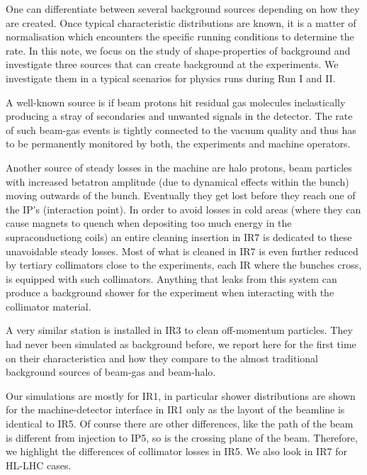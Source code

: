 One can differentiate between several background sources depending on how they are created. Once typical characteristic distributions are known, it is a matter of normalisation which encounters the specific running conditions to determine the rate. In this note, we focus on the study of shape-properties of background and investigate three sources that can create background at the experiments. We investigate them in a typical scenarios for physics runs during Run I and II.

A well-known source is if beam protons hit residual gas molecules inelastically producing a stray of secondaries and unwanted signals in the detector. The rate of such beam-gas events is tightly connected to the vacuum quality and thus has to be permanently monitored by both, the experiments and machine operators.

Another source of steady losses in the machine are halo protons, beam particles with increased betatron amplitude (due to dynamical effects within the bunch) moving outwards of the bunch. Eventually they get lost before they reach one of the IP's (interaction point). In order to avoid losses in cold areas (where they can cause magnets to quench when depositing too much energy in the supraconductiong coils) an entire cleaning insertion in IR7 is dedicated to these unavoidable steady losses. Most of what is cleaned in IR7 is even further reduced by tertiary collimators close to the experiments, each IR where the bunches cross, is equipped with such collimators. Anything that leaks from this system can produce a background shower for the experiment when interacting with the collimator material. 

A very similar station is installed in IR3 to clean off-momentum particles. They had never been simulated as background before, we report here for the first time on their characteristica and how they compare to the almost traditional background sources of beam-gas and beam-halo. 

Our simulations are mostly for IR1, in particular shower distributions are shown for the machine-detector interface in IR1 only as the layout of the beamline is identical to IR5. Of course there are other differences, like the path of the beam is different from injection to IP5, so is the crossing plane of the beam. Therefore, we highlight the differences of collimator losses in IR5. We also look in IR7 for HL-LHC cases.
